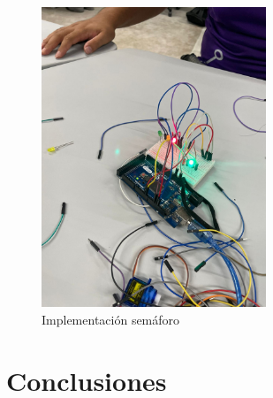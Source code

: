 \documentclass{article}
\begin{document}
\begin{figure}[H]
    \centering
    \includegraphics[width=0.6\textwidth]{./img/semaforo.jpeg}
    \caption{Implementación semáforo}
    \label{fig:leds_secuenciales_flowchart}
\end{figure}

\section{Conclusiones}



\end{document}
